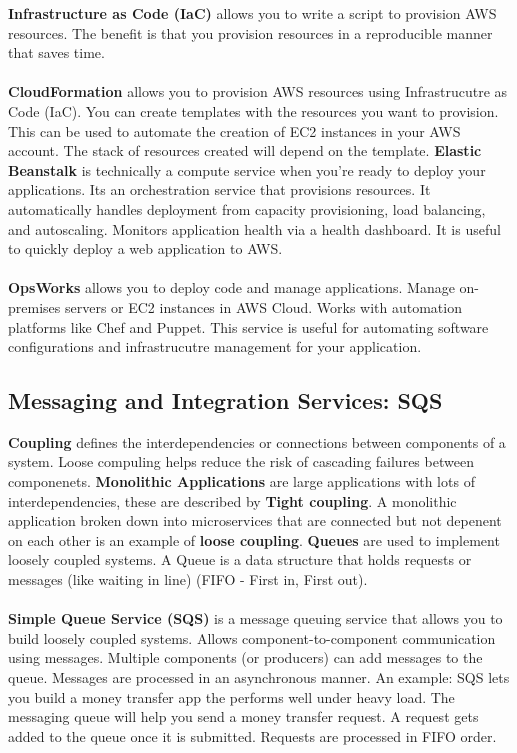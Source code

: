 \documentclass{article}%
\begin{document}
\textbf{Infrastructure as Code (IaC)} allows you to write a script to provision AWS resources. The benefit is that you provision resources in a reproducible manner that saves time.  \\ \\
\textbf{CloudFormation} allows you to provision AWS resources using Infrastrucutre as Code (IaC). You can create templates with the resources you want to provision. This can be used to automate the creation of EC2 instances in your AWS account. The stack of resources created will depend on the template.
\textbf{Elastic Beanstalk} is technically a compute service when you're ready to deploy your applications. Its an orchestration service that provisions resources. It automatically handles deployment from capacity provisioning, load balancing, and autoscaling. Monitors application health via a health dashboard. It is useful to quickly deploy a web application to AWS. \\ \\
\textbf{OpsWorks} allows you to deploy code and manage applications. Manage on-premises servers or EC2 instances in AWS Cloud. Works with automation platforms like Chef and Puppet. This service is useful for automating software configurations and infrastrucutre management for your application.  \\
\subsection{Messaging and Integration Services: SQS}
\textbf{Coupling} defines the interdependencies or connections between components of a system. Loose compuling helps reduce the risk of cascading failures between componenets. \textbf{Monolithic Applications} are large applications with lots of interdependencies, these are described by \textbf{Tight coupling}. A monolithic application broken down into microservices that are connected but not depenent on each other is an example of \textbf{loose coupling}. 
\textbf{Queues} are used to implement loosely coupled systems. A Queue is a data structure that holds requests or messages (like waiting in line) (FIFO - First in, First out). \\ \\
\textbf{Simple Queue Service (SQS)} is a message queuing service that allows you to build loosely coupled systems. Allows component-to-component communication using messages. Multiple components (or producers) can add messages to the queue. Messages are processed in an asynchronous manner. An example: SQS lets you build a money transfer app the performs well under heavy load. The messaging queue will help you send a money transfer request. A request gets added to the queue once it is submitted. Requests are processed in FIFO order.
\end{document}
